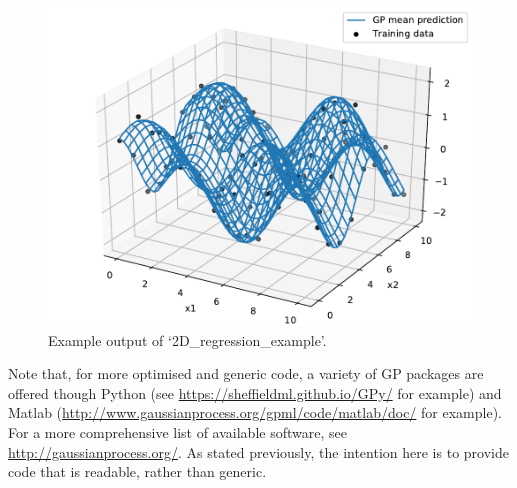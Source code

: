 \documentclass[a4paper, 11pt]{article}
\DeclareMathOperator{\f}{\boldsymbol{f}}
\DeclareMathOperator{\y}{\boldsymbol{y}}
\begin{document}
\begin{figure}[H]
	\centering
	\includegraphics[scale=0.6,trim={0 0cm 0 0cm},clip]{figures/2D_regression.pdf}
	\caption{Example output of `2D\_regression\_example'.}
	\label{fig:2D_regression_example}
\end{figure}

Note that, for more optimised and generic code, a variety of GP packages are offered though Python (see \url{https://sheffieldml.github.io/GPy/} for example) and Matlab (\url{http://www.gaussianprocess.org/gpml/code/matlab/doc/} for example). For a more comprehensive list of available software, see \url{http://gaussianprocess.org/}. As stated previously, the intention here is to provide code that is readable, rather than generic. \\


\end{document}
